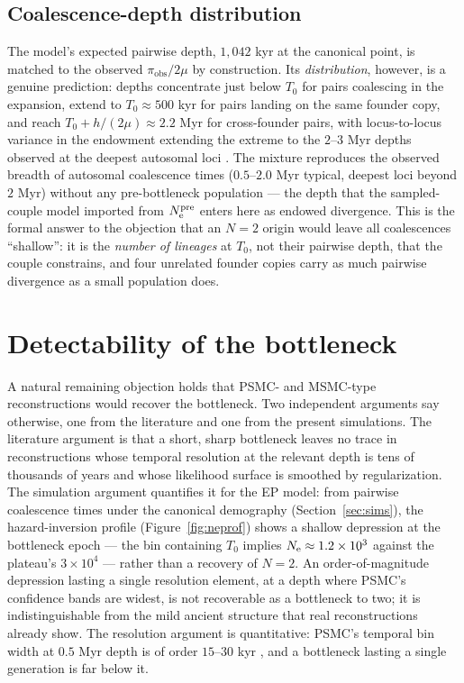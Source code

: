 \subsection{Coalescence-depth distribution}
The model's expected pairwise depth, $1{,}042$ kyr at the canonical point,
is matched to the observed $\pi_{\mathrm{obs}}/2\mu$ by construction. Its
\emph{distribution}, however, is a genuine prediction: depths concentrate
just below $T_0$ for pairs coalescing in the expansion, extend to
$T_0 \approx 500$ kyr for pairs landing on the same founder copy, and
reach $T_0 + h/(2\mu) \approx 2.2$ Myr for cross-founder pairs, with
locus-to-locus variance in the endowment extending the extreme to the
$2$--$3$ Myr depths observed at the deepest autosomal loci
\citep{GarriganHammer2005,LiDurbin2011}. The mixture reproduces the
observed breadth of autosomal coalescence times ($0.5$--$2.0$ Myr typical,
deepest loci beyond $2$ Myr) without any pre-bottleneck population ---
the depth that the sampled-couple model imported from $N_{\mathrm{e}}^{\mathrm{pre}}$ enters here
as endowed divergence. This is the formal answer to the objection that an
$N=2$ origin would leave all coalescences ``shallow'': it is the
\emph{number of lineages} at $T_0$, not their pairwise depth, that the
couple constrains, and four unrelated founder copies carry as much pairwise
divergence as a small population does.

\section{Detectability of the bottleneck}\label{sec:ne}
A natural remaining objection holds that PSMC- and MSMC-type
reconstructions \citep{LiDurbin2011,SchiffelsDurbin2014} would recover the
bottleneck. Two independent arguments say otherwise, one from the literature
and one from the present simulations. The literature argument is that a
short, sharp bottleneck leaves no trace in
reconstructions whose temporal resolution at the relevant depth is tens of
thousands of years \citep{LiDurbin2011} and whose likelihood surface is
smoothed by
regularization. The simulation argument quantifies it for the EP model:
from pairwise coalescence times under the canonical demography
(Section~\ref{sec:sims}), the hazard-inversion profile
(Figure~\ref{fig:neprof}) shows a shallow depression at the bottleneck
epoch --- the bin containing $T_0$ implies $N_{\mathrm{e}} \approx 1.2\times10^{3}$
against the plateau's $3\times10^4$ --- rather than a recovery of
$N = 2$. An order-of-magnitude depression lasting a single resolution
element, at a depth where PSMC's confidence bands are widest, is not
recoverable as a bottleneck to two; it is indistinguishable from the mild
ancient structure that real reconstructions already show. The resolution
argument is quantitative: PSMC's temporal bin width at $0.5$ Myr depth is
of order $15$--$30$ kyr \citep{LiDurbin2011}, and a bottleneck lasting a
single generation is far below it.

